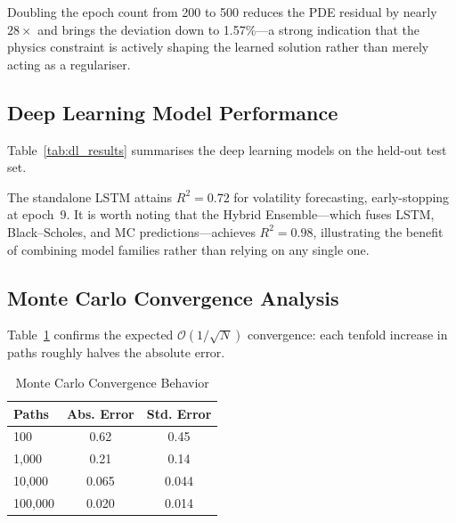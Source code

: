 \documentclass[conference]{IEEEtran}
\begin{document}
Doubling the epoch count from 200 to 500 reduces the PDE residual by nearly $28\times$ and brings the deviation down to 1.57\%---a strong indication that the physics constraint is actively shaping the learned solution rather than merely acting as a regulariser.

\subsection{Deep Learning Model Performance}

Table~\ref{tab:dl_results} summarises the deep learning models on the held-out test set.

\begin{table}[htbp]
\caption{Deep Learning Model Evaluation Results}
\label{tab:dl_results}
\centering
\small
\setlength{\tabcolsep}{4pt}
\end{table}

The standalone LSTM attains $R^2 = 0.72$ for volatility forecasting, early-stopping at epoch~9. It is worth noting that the Hybrid Ensemble---which fuses LSTM, Black--Scholes, and MC predictions---achieves $R^2 = 0.98$, illustrating the benefit of combining model families rather than relying on any single one.

\subsection{Monte Carlo Convergence Analysis}

Table~\ref{tab:mc_convergence} confirms the expected $\mathcal{O}(1/\sqrt{N})$ convergence: each tenfold increase in paths roughly halves the absolute error.

\begin{table}[htbp]
\caption{Monte Carlo Convergence Behavior}
\label{tab:mc_convergence}
\centering
\small
\setlength{\tabcolsep}{6pt}
\renewcommand{\arraystretch}{1.05}
\begin{tabular}{lcc}
\toprule
\textbf{Paths} & \textbf{Abs. Error} & \textbf{Std. Error} \\
\midrule
100 & 0.62 & 0.45 \\
1,000 & 0.21 & 0.14 \\
10,000 & 0.065 & 0.044 \\
100,000 & 0.020 & 0.014 \\
\bottomrule
\end{tabular}
\end{table}
\end{document}
